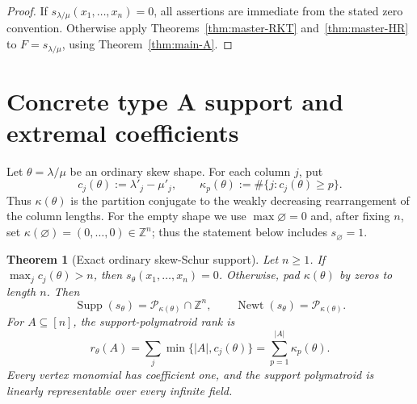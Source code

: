 \documentclass[11pt,a4paper,oneside]{amsart}
\numberwithin{equation}{section}
\newtheorem{theorem}{Theorem}[section]
\theoremstyle{definition}
\theoremstyle{remark}
\DeclareMathOperator{\Supp}{Supp}
\DeclareMathOperator{\Newt}{Newt}
\newcommand{\Z}{\mathbb Z}
\begin{document}
\begin{proof}
If $s_{\lambda/\mu}(x_1,\ldots,x_n)=0$, all assertions are immediate from the stated zero convention.  Otherwise apply Theorems~\ref{thm:master-RKT} and~\ref{thm:master-HR} to $F=s_{\lambda/\mu}$, using Theorem~\ref{thm:main-A}.
\end{proof}

\section{Concrete type A support and extremal coefficients}\label{sec:concrete-A}

Let $\theta=\lambda/\mu$ be an ordinary skew shape.  For each column $j$, put
\begin{equation}\label{eq:ordinary-column-heights}
 c_j(\theta):=\lambda'_j-\mu'_j,
 \qquad
 \kappa_p(\theta):=\#\{j:c_j(\theta)\geq p\}.
\end{equation}
Thus $\kappa(\theta)$ is the partition conjugate to the weakly decreasing
rearrangement of the column lengths.  For the empty shape we use
$\max\varnothing=0$ and, after fixing $n$, set
$\kappa(\varnothing)=(0,\ldots,0)\in\mathbb Z^n$; thus the statement below
includes $s_\varnothing=1$.

\begin{theorem}[Exact ordinary skew-Schur support]\label{thm:ordinary-skew-support}
Let $n\geq1$.  If $\max_j c_j(\theta)>n$, then
$s_\theta(x_1,\ldots,x_n)=0$.  Otherwise, pad $\kappa(\theta)$ by zeros to
length $n$.  Then
\begin{equation}\label{eq:ordinary-skew-support}
 \Supp(s_\theta)=\mathcal P_{\kappa(\theta)}\cap\Z^n,
 \qquad
 \Newt(s_\theta)=\mathcal P_{\kappa(\theta)}.
\end{equation}
For $A\subseteq[n]$, the support-polymatroid rank is
\begin{equation}\label{eq:ordinary-skew-rank}
 r_\theta(A)
 =\sum_j\min\{|A|,c_j(\theta)\}
 =\sum_{p=1}^{|A|}\kappa_p(\theta).
\end{equation}
Every vertex monomial has coefficient one, and the support polymatroid is
linearly representable over every infinite field.
\end{theorem}
\end{document}

